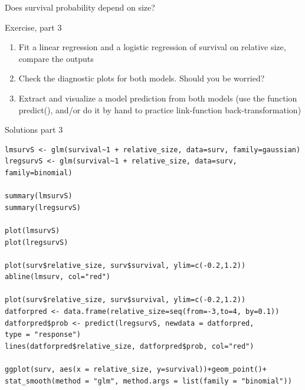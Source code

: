 \documentclass[10pt]{beamer}
\makeatletter
\newenvironment{kframe}{%
 \def\at@end@of@kframe{}%
 \ifinner\ifhmode%
  \def\at@end@of@kframe{\end{minipage}}%
  \begin{minipage}{\columnwidth}%
 \fi\fi%
 \def\FrameCommand##1{\hskip\@totalleftmargin \hskip-\fboxsep
 \colorbox{shadecolor}{##1}\hskip-\fboxsep
     \hskip-\linewidth \hskip-\@totalleftmargin \hskip\columnwidth}%
 \MakeFramed {\advance\hsize-\width
   \@totalleftmargin\z@ \linewidth\hsize
   \@setminipage}}%
 {\par\unskip\endMakeFramed%
 \at@end@of@kframe}
\newenvironment{knitrout}{}{} %
\makeatother
\begin{document}
\begin{frame}{Does survival probability depend on size?}
 
  \begin{exampleblock}{Exercise, part 3}
    \begin{enumerate}
      \item Fit a linear regression and a logistic regression of survival on relative size, compare the outputs
      \item Check the diagnostic plots for both models. Should you be worried?
      \item Extract and visualize a model prediction from both models (use the function predict(), and/or do it by hand to practice link-function back-transformation)
    \end{enumerate}
  \end{exampleblock}
  
\end{frame}


\begin{frame}[fragile]{Solutions part 3}
     
\begin{knitrout}
\color{fgcolor}\begin{kframe}
\footnotesize
\begin{verbatim}
lmsurvS <- glm(survival~1 + relative_size, data=surv, family=gaussian)
lregsurvS <- glm(survival~1 + relative_size, data=surv, family=binomial)

summary(lmsurvS)
summary(lregsurvS)

plot(lmsurvS)
plot(lregsurvS)

plot(surv$relative_size, surv$survival, ylim=c(-0.2,1.2))
abline(lmsurv, col="red")

plot(surv$relative_size, surv$survival, ylim=c(-0.2,1.2))
datforpred <- data.frame(relative_size=seq(from=-3,to=4, by=0.1))
datforpred$prob <- predict(lregsurvS, newdata = datforpred,
type = "response")
lines(datforpred$relative_size, datforpred$prob, col="red")

ggplot(surv, aes(x = relative_size, y=survival))+geom_point()+
stat_smooth(method = "glm", method.args = list(family = "binomial"))

\end{verbatim}
\end{kframe}
\end{knitrout}
\end{frame}
\end{document}

